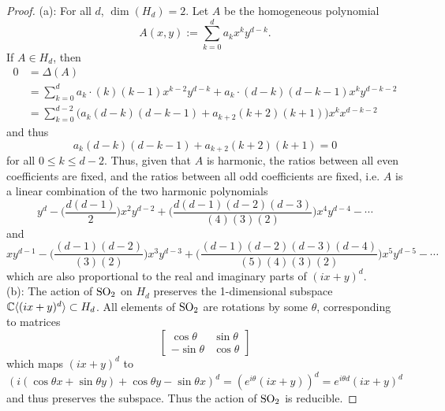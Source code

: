 \documentclass{amsart}
\begin{document}
	\begin{proof}
		(a): For all $d$, $\dim(H_d)=2$. Let $A$ be the homogeneous polynomial
		$$
		A(x,y) := \sum_{k=0}^d a_k x^ky^{d-k}.
		$$
		If $A\in H_d$, then 
		\begin{align*}
			0 &= \Delta(A)\\
		 &= \sum_{k=0}^d a_k \cdot (k)(k-1) x^{k-2}y^{d-k} + a_k\cdot (d-k)(d-k-1) x^ky^{d-k-2}\\
		&= \sum_{k=0}^{d-2} \Big(a_{k}(d-k)(d-k-1) + a_{k+2}(k+2)(k+1)\Big) x^kx^{d-k-2}
		\end{align*}
		and thus 
		$$
		a_{k}(d-k)(d-k-1) + a_{k+2}(k+2)(k+1) = 0
		$$
		for all $0\leq k \leq d-2$. Thus, given that $A$ is harmonic, the ratios between all even coefficients are fixed, and the ratios between all odd coefficients are fixed, i.e. $A$ is a linear combination of the two harmonic polynomials
		$$
		y^d - \Big(\frac{d(d-1)}{2}\Big)x^2y^{d-2} + \Big(\frac{d(d-1)(d-2)(d-3)}{(4)(3)(2)}\Big)x^4y^{d-4} - \cdots
		$$
		and 
		$$
		xy^{d-1} - \Big(\frac{(d-1)(d-2)}{(3)(2)}\Big)x^3y^{d-3} + \Big(\frac{(d-1)(d-2)(d-3)(d-4)}{(5)(4)(3)(2)}\Big)x^5y^{d-5} - \cdots 
		$$
		which are also proportional to the real and imaginary parts of $(ix+y)^d$.\\
		
		(b): The action of $\operatorname{SO}_2$ on $H_d$ preserves the 1-dimensional subspace $\mathbb{C}\langle(ix+y)^d\rangle\subset H_d$. All elements of $\operatorname{SO}_2$ are rotations by some $\theta$, corresponding to matrices
		$$
		\begin{bmatrix}
			\cos \theta & \sin \theta \\
			-\sin \theta & \cos\theta
		\end{bmatrix}
		$$
		which maps $(ix+y)^d$ to 
		$$
		(i(\cos\theta x + \sin\theta y) + \cos\theta y - \sin\theta x)^d = (e^{i\theta}(ix + y))^d = e^{i\theta d} (ix+y)^d
		$$
		and thus preserves the subspace. Thus the action of $\operatorname{SO}_2$ is reducible.
		
	\end{proof}
		
\end{document}
